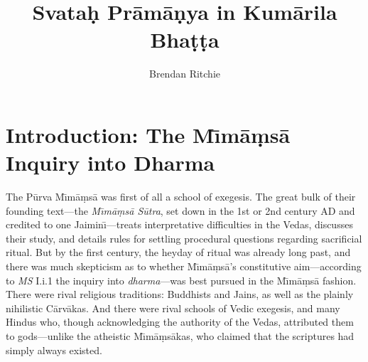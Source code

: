 \documentclass[11pt,letterpaper,oneside]{amsart}
\author{Brendan Ritchie}
\title{Svata\d{h} Pr\={a}m\={a}\d{n}ya in Kum\=arila Bha\d t\d ta}
\begin{document}
\maketitle

\thispagestyle{empty}

%










\section{Introduction: The M\={\i}m\=a\d ms\=a Inquiry into Dharma} \label{intro}

The P\=urva M\={\i}m\=a\d ms\=a was first of all a school of exegesis. The great bulk of their founding text---the \emph{M\={\i}m\=a\d ms\=a S\=utra}, set down in the 1st or 2nd century AD and credited to one Jaimin\={\i}---treats interpretative difficulties in the Vedas, discusses their study, and details rules for settling procedural questions regarding sacrificial ritual. But by the first century, the heyday of ritual was already long past, and there was much skepticism as to whether M\={\i}m\=a\d ms\=a's constitutive aim---according to \emph{MS} I.i.1 the inquiry into \emph{dharma}---was best pursued in the M\={\i}m\=a\d ms\=a fashion. There were rival religious traditions: Buddhists and Jains, as well as the plainly nihilistic C\=arv\=akas. And there were rival schools of Vedic exegesis, and many Hindus who, though acknowledging the authority of the Vedas, attributed them to gods---unlike the atheistic M\={\i}m\=a\d ms\=akas, who claimed that the scriptures had simply always existed. 
\end{document}
